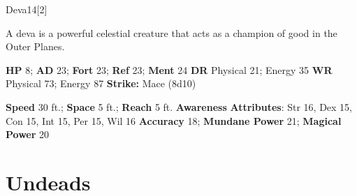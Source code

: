   \begin{monsection}{Deva}{14}[2]
    \vspace{-1em}\vspace{-1em}
    \vspace{0em}

    
      A deva is a powerful celestial creature that acts as a champion of good in the Outer Planes.
    

    \begin{spellcontent}
      \begin{spelltargetinginfo}
        \pari \textbf{HP} 8;
          \textbf{AD} 23;
          \textbf{Fort} 23;
          \textbf{Ref} 23;
          \textbf{Ment} 24
        \pari \textbf{DR} Physical 21; Energy 35
        \pari \textbf{WR} Physical 73; Energy 87
        \pari \textbf{Strike:}
            Mace  (8d10)
      \end{spelltargetinginfo}
    \end{spellcontent}
    \begin{monsterfooter}
      \pari \textbf{Speed} 30 ft.;
        \textbf{Space} 5 ft.;
        \textbf{Reach} 5 ft.
      \pari \textbf{Awareness} 
      \pari \textbf{Attributes}:
        Str 16, Dex 15,
        Con 15, Int 15,
        Per 15, Wil 16
      \pari \textbf{Accuracy} 18;
        \textbf{Mundane Power} 21;
      \textbf{Magical Power} 20
    \end{monsterfooter}
  \end{monsection}
  
  
        \section{Undeads}
      
